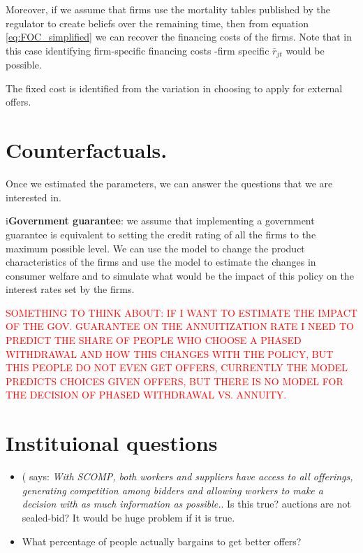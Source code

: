 \documentclass[12pt]{article}
\theoremstyle{plain}
\theoremstyle{plain}
\begin{document}
Moreover, if we assume that firms use the mortality tables published by the regulator to create beliefs over the remaining time, then from equation \ref{eq:FOC_simplified} we can recover the financing costs of the firms. Note that in this case identifying firm-specific financing costs -firm specific $\bar{r}_{jt}$ would be possible. 

The fixed cost is identified from the variation in choosing to apply for external offers. 






\section{Counterfactuals.}

Once we estimated the parameters, we can answer the questions that we are interested in. 

i\textbf{Government guarantee}: we assume that implementing a government guarantee is equivalent to setting the credit rating of all the firms to the maximum possible level. We can use the model to change the product characteristics of the firms and use the model to estimate the changes in consumer welfare and to simulate what would be the impact of this policy on the interest rates set by the firms. 

\textcolor{red}{SOMETHING TO THINK ABOUT: IF I WANT TO ESTIMATE THE IMPACT OF THE GOV. GUARANTEE ON THE ANNUITIZATION RATE I NEED TO PREDICT THE SHARE OF PEOPLE WHO CHOOSE A PHASED WITHDRAWAL AND HOW THIS CHANGES WITH THE POLICY, BUT THIS PEOPLE DO NOT EVEN GET OFFERS, CURRENTLY THE MODEL PREDICTS CHOICES GIVEN OFFERS, BUT THERE IS NO MODEL FOR THE DECISION OF PHASED WITHDRAWAL VS. ANNUITY.  }

\section{Instituional questions}

\begin{itemize}
    \item (\textcite[p. 391]{morales_chilean_2017} says: \textit{With SCOMP, both workers and suppliers have access to all offerings, generating competition among bidders and allowing workers to make a decision with as much information as possible.}. Is this true? auctions are not sealed-bid? It would be huge problem if it is true.  

    \item What percentage of people actually bargains to get better offers? 
    
\end{itemize}
\end{document}
